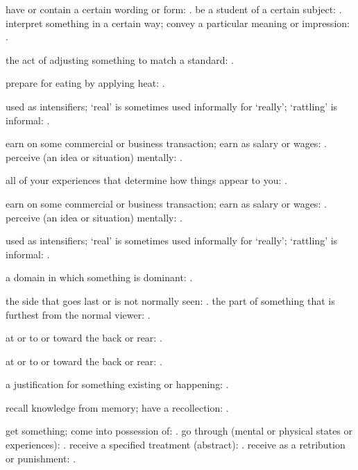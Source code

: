   have or contain a certain wording or form: . be a student of a certain subject: . interpret something in a certain way; convey a particular meaning or impression: .

  the act of adjusting something to match a standard: .

  prepare for eating by applying heat: .

  used as intensifiers; `real' is sometimes used informally for `really'; `rattling' is informal: .

  earn on some commercial or business transaction; earn as salary or wages: . perceive (an idea or situation) mentally: .

  all of your experiences that determine how things appear to you: .

  earn on some commercial or business transaction; earn as salary or wages: . perceive (an idea or situation) mentally: .

  used as intensifiers; `real' is sometimes used informally for `really'; `rattling' is informal: .

  a domain in which something is dominant: .

  the side that goes last or is not normally seen: . the part of something that is furthest from the normal viewer: .

  at or to or toward the back or rear: .

  at or to or toward the back or rear: .

  a justification for something existing or happening: .

  recall knowledge from memory; have a recollection: .

  get something; come into possession of: . go through (mental or physical states or experiences): . receive a specified treatment (abstract): . receive as a retribution or punishment: .


